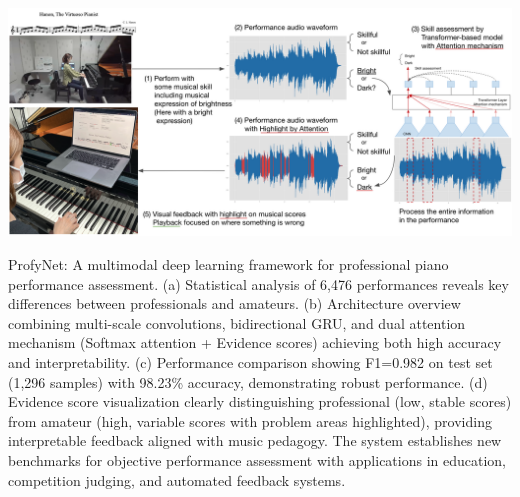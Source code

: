\documentclass[sigconf,review,anonymous]{acmart}
\begin{document}
\begin{teaserfigure}
\centering
  \includegraphics[width=\textwidth]{figures/teaser_v201.png}
  \caption{ProfyNet: A multimodal deep learning framework for professional piano performance assessment. (a) Statistical analysis of 6,476 performances reveals key differences between professionals and amateurs. (b) Architecture overview combining multi-scale convolutions, bidirectional GRU, and dual attention mechanism (Softmax attention + Evidence scores) achieving both high accuracy and interpretability. (c) Performance comparison showing F1=0.982 on test set (1,296 samples) with 98.23\% accuracy, demonstrating robust performance. (d) Evidence score visualization clearly distinguishing professional (low, stable scores) from amateur (high, variable scores with problem areas highlighted), providing interpretable feedback aligned with music pedagogy. The system establishes new benchmarks for objective performance assessment with applications in education, competition judging, and automated feedback systems.}
  \label{fig:teaser}
\end{teaserfigure}

\maketitle
\end{document}
